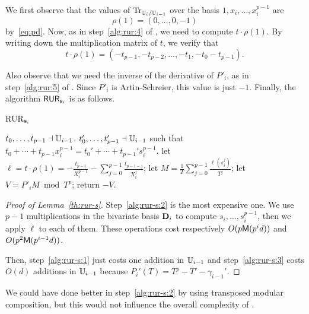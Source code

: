 We first observe that the values of $\operatorname{Tr}_{\mathbb{U}_i/\mathbb{U}_{i-1}}$ over the
basis $1,x_i,\ldots,x_i^{p-1}$ are 
\begin{equation}
  \label{eq:110}
  \rho(1) = (0,\ldots,0,-1)
\end{equation}
by~\eqref{eq:pd}. Now, as in step~\ref{alg:rur:4} of , we
need to compute $t\cdot\rho(1)$. By writing down the multiplication
matrix of $t$, we verify that
\begin{equation}
  \label{eq:111}
  t\cdot\rho(1) = (-t_{p-1}, -t_{p-2}, \ldots, -t_1, -t_0-t_{p-1})
  \text{.}
\end{equation}

Also observe that we need the inverse of the derivative of $P'_i$, as
in step~\ref{alg:rur:5} of . Since $P'_i$ is Artin-Schreier,
this value is just $-1$. Finally, the algorithm
${\sf RUR}_{\mathbf{s}_i}$ is as follows.

\begin{algorithm}
  \caption{RUR$_{\mathbf{s}_i}$}
  \begin{algorithmic}[1]
    \REQUIRE $t_0,\ldots,t_{p-1}\dashv\mathbb{U}_{i-1}$.
    \ENSURE $t_0',\ldots,t_{p-1}'\dashv\mathbb{U}_{i-1}$ such that $t_0+\cdots+t_{p-1}x_i^{p-1}=t_0'+\cdots+t_{p-1}'s_i^{p-1}$.
    \STATE \label{alg:rur-s:1}let $\ell = t\cdot\rho(1) =  -\frac{t_{p-1}}{X_i^{p-1}} - \sum_{j=0}^{p-1} \frac{t_{p-1-j}}{X_i^j}$;
    \STATE \label{alg:rur-s:2}let $M = \frac{1}{T}\sum_{j=0}^{p-1}\frac{\ell(s_i^j)}{T^j}$;
    \STATE \label{alg:rur-s:3}let $V = P'_iM \bmod T^p$;
    \STATE return $-V$.
  \end{algorithmic}
\end{algorithm}

\begin{proof}[Proof of Lemma~\ref{th:rur-s}]
  Step~\ref{alg:rur-s:2} is the most expensive one. We use $p-1$
  multiplications in the bivariate basis $\mathbf{D}_i$ to compute
  $s_i,\ldots,s_i^{p-1}$, then we apply $\ell$ to each of them. These
  operations cost respectively $O(p\mathsf{M}(p^id))$ and
  $O(p^2\mathsf{M}(p^{i-1}d))$.

  Then, step~\ref{alg:rur-s:1} just costs one addition in $\mathbb{U}_{i-1}$
  and step~\ref{alg:rur-s:3} costs $O(d)$ additions in $\mathbb{U}_{i-1}$
  because $P_i'(T)=T^p-T'-\gamma_{i-1}'$.
\end{proof}

\begin{nota}
  We could have done better in step~\ref{alg:rur-s:2} by using
  transposed modular composition, but this would not influence the
  overall complexity of .
\end{nota}

